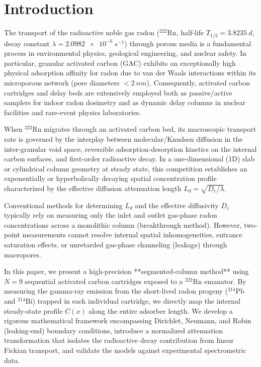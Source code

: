 \documentclass[11pt,a4paper]{article}
\begin{document}
\hruler
\tableofcontents
\vspace{0.5cm}

\section{Introduction}
The transport of the radioactive noble gas radon ($^{222}\text{Rn}$, half-life $T_{1/2} = \SI{3.8235}{d}$, decay constant $\lambda = \SI{2.0982e-6}{s^{-1}}$) through porous media is a fundamental process in environmental physics, geological engineering, and nuclear safety. In particular, granular activated carbon (GAC) exhibits an exceptionally high physical adsorption affinity for radon due to van der Waals interactions within its microporous network (pore diameters $<\SI{2}{nm}$). Consequently, activated carbon cartridges and delay beds are extensively employed both as passive/active samplers for indoor radon dosimetry and as dynamic delay columns in nuclear facilities and rare-event physics laboratories.

When $^{222}\text{Rn}$ migrates through an activated carbon bed, its macroscopic transport rate is governed by the interplay between molecular/Knudsen diffusion in the inter-granular void space, reversible adsorption-desorption kinetics on the internal carbon surfaces, and first-order radioactive decay. In a one-dimensional (1D) slab or cylindrical column geometry at steady state, this competition establishes an exponentially or hyperbolically decaying spatial concentration profile characterized by the effective diffusion attenuation length $L_d = \sqrt{D_e / \lambda}$.

Conventional methods for determining $L_d$ and the effective diffusivity $D_e$ typically rely on measuring only the inlet and outlet gas-phase radon concentrations across a monolithic column (breakthrough method). However, two-point measurements cannot resolve internal spatial inhomogeneities, entrance saturation effects, or unretarded gas-phase channeling (leakage) through macropores. 

In this paper, we present a high-precision **segmented-column method** using $N=9$ sequential activated carbon cartridges exposed to a $^{222}\text{Rn}$ emanator. By measuring the gamma-ray emission from the short-lived radon progeny ($^{214}\text{Pb}$ and $^{214}\text{Bi}$) trapped in each individual cartridge, we directly map the internal steady-state profile $C(x)$ along the entire adsorber length. We develop a rigorous mathematical framework encompassing Dirichlet, Neumann, and Robin (leaking-end) boundary conditions, introduce a normalized attenuation transformation that isolates the radioactive decay contribution from linear Fickian transport, and validate the models against experimental spectrometric data.
\end{document}
